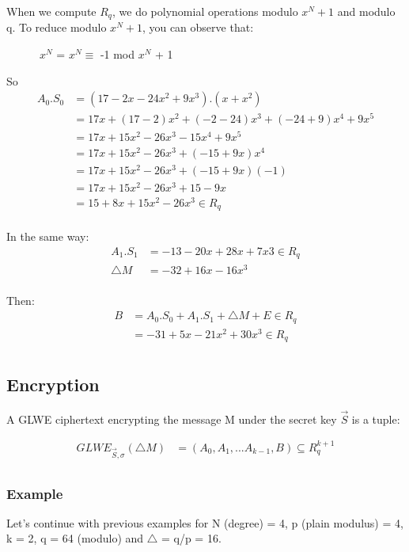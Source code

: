 \documentclass{techrep}
\theoremstyle{definition}
\theoremstyle{plain}
\begin{document}
When we compute $R_q$, we do polynomial operations modulo $x^N + 1$ and modulo q. 
To reduce modulo $x^N + 1$, you can observe that:


        $\quad \quad \quad  x^N$  = $x^N \equiv$ -1 mod $x^N$ + 1

So
	\begin{align*}
		 A_0.S_0 &=  (17-2x -24x^2 +9x^3).(x + x^2) \\
            &= 17x + (17-2)x^2 + (-2-24)x^3 + (-24+9)x^4 + 9x^5  \\
            &= 17x + 15x^2 -26x^3 - 15x^4 + 9x^5  \\
            &= 17x + 15x^2 -26x^3 + (-15 + 9x)x^4  \\
            &= 17x + 15x^2 -26x^3 + (-15 + 9x)(-1)  \\
            &= 17x + 15x^2 -26x^3 + 15  -9x  \\
            &= 15 + 8x + 15x^2 -26x^3  \in R_q \\
	\end{align*}

In the same way:
	\begin{align*}
		 A_1.S_1 &=  -13-20x+28x+7x3 \in R_q \\
         \bigtriangleup M &= -32 +16x - 16x^3  \\
	\end{align*}

Then:
	\begin{align*}
		 B &=   A_0.S_0 + A_1.S_1 + \bigtriangleup M + E \in R_q  \\
          &= -31 + 5x - 21x^2 + 30x^3 \in R_q  \\
	\end{align*}


	\subsection{Encryption}
A GLWE ciphertext encrypting the message M under the secret key $\overrightarrow{S}$ is a tuple:

	\begin{align*}
GLWE_{\overrightarrow{S},\sigma}(\bigtriangleup M)	&=	 (A_0,A_1,...A_{k-1}, B) \subseteq  R_{q}^{k+1} \\
	\end{align*}

\subsubsection{Example}
Let’s continue with previous examples for N (degree) = 4, p (plain modulus) = 4, k = 2, q = 64 (modulo) and $\bigtriangleup$ = q/p = 16.
\end{document}
